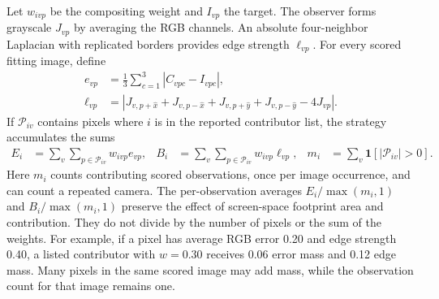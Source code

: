 Let $w_{ivp}$ be the compositing weight and $I_{vp}$ the target. The observer forms grayscale $J_{vp}$ by averaging the RGB channels. An absolute four-neighbor Laplacian with replicated borders provides edge strength $\ell_{vp}$. For every scored fitting image, define
\begin{align}
 e_{vp}&=\tfrac13\textstyle\sum_{c=1}^3 |C_{vpc}-I_{vpc}|,\\
 \ell_{vp}&=|J_{v,p+\hat x}+J_{v,p-\hat x}+J_{v,p+\hat y}+J_{v,p-\hat y}-4J_{vp}|.
\end{align}
If $\mathcal P_{iv}$ contains pixels where $i$ is in the reported contributor list, the strategy accumulates the sums
\begin{align}
 E_i &=\sum_{v}\sum_{p\in\mathcal P_{iv}}w_{ivp}e_{vp},&
 B_i &=\sum_{v}\sum_{p\in\mathcal P_{iv}}w_{ivp}\ell_{vp},&
 m_i &=\sum_v\mathbf 1[|\mathcal P_{iv}|>0].
\end{align}
Here $m_i$ counts contributing scored observations, once per image occurrence, and can count a repeated camera. The per-observation averages $E_i/\max(m_i,1)$ and $B_i/\max(m_i,1)$ preserve the effect of screen-space footprint area and contribution. They do not divide by the number of pixels or the sum of the weights. For example, if a pixel has average RGB error 0.20 and edge strength 0.40, a listed contributor with $w=0.30$ receives 0.06 error mass and 0.12 edge mass. Many pixels in the same scored image may add mass, while the observation count for that image remains one.

